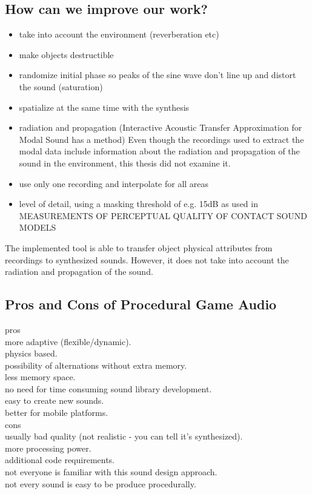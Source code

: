 \subsection{How can we improve our work?}
\begin{itemize}
\item take into account the environment (reverberation etc)
\item make objects destructible
\item randomize initial phase so peaks of the sine wave don't line up and distort the sound (saturation)
\item spatialize at the same time with the synthesis
\item radiation and propagation (Interactive Acoustic Transfer Approximation for Modal Sound has a method)
Even though the recordings used to extract the modal data include information about the radiation and propagation of the sound in the environment, this thesis did not examine it.
\item use only one recording and interpolate for all areas
\item level of detail, using a masking threshold of e.g. 15dB as used in MEASUREMENTS OF PERCEPTUAL QUALITY OF CONTACT SOUND MODELS
\end{itemize}

The implemented tool is able to transfer object physical attributes from recordings to synthesized sounds. However, it does not take into account the radiation and propagation of the sound. 

\subsection{Pros and Cons of Procedural Game Audio}
pros\\
more adaptive (flexible/dynamic).\\
physics based.\\
possibility of alternations without extra memory.\\
less memory space.\\
no need for time consuming sound library development.\\
easy to create new sounds.\\
better for mobile platforms.\\

cons\\
usually bad quality (not realistic - you can tell it's synthesized).\\
more processing power.\\
additional code requirements.\\
not everyone is familiar with this sound design approach.\\
not every sound is easy to be produce procedurally.\\
